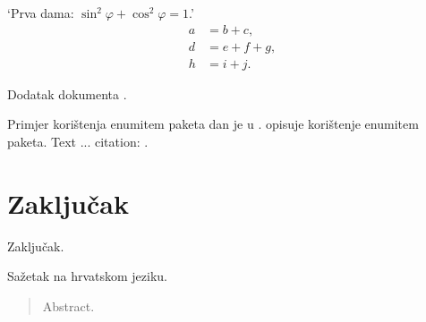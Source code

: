 \documentclass[times, utf8, diplomski]{fer}
\begin{document}
‘Prva dama: $\sin^2 \varphi + \cos^2 \varphi = 1$.’ \citep{ungar2002uvod} \cite{oetiket2007lshort}
\begin{align}
a&=b+c,\label{eq:a}\\
d&=e+f+g,\\
h&=i+j.\label{eq:h}
\end{align}

Dodatak dokumenta .

Primjer korištenja enumitem paketa dan je u \citep{collins2008enum}.
\citet{collins2008enum} opisuje korištenje enumitem paketa.
\cite{greenwade93}
Text ... citation: \cite{greenwade93}.

\chapter{Zaključak}
Zaključak.




\begin{sazetak}
Sažetak na hrvatskom jeziku.

\end{sazetak}

\begin{abstract}
Abstract.

\end{abstract}
\end{document}

